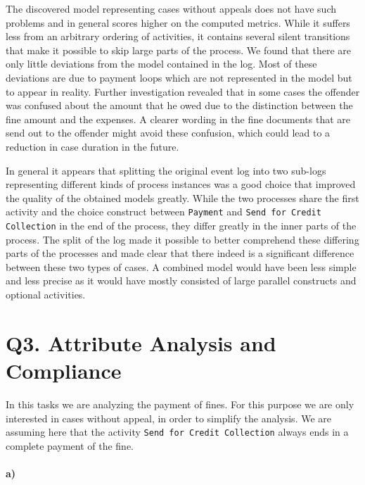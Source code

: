 \documentclass[12pt]{report}
\begin{document}
The discovered model representing cases without appeals does not have such problems and in general scores higher on the computed metrics. While it suffers less from an arbitrary ordering of activities, it contains several silent transitions that make it possible to skip large parts of the process. We found that there are only little deviations from the model contained in the log. Most of these deviations are due to payment loops which are not represented in the model but to appear in reality. Further investigation revealed that in some cases the offender was confused about the amount that he owed due to the distinction between the fine amount and the expenses. A clearer wording in the fine documents that are send out to the offender might avoid these confusion, which could lead to a reduction in case duration in the future.

In general it appears that splitting the original event log into two sub-logs representing different kinds of process instances was a good choice that improved the quality of the obtained models greatly. While the two processes share the first activity and the choice construct between \texttt{Payment} and \texttt{Send for Credit Collection} in the end of the process, they differ greatly in the inner parts of the process. The split of the log made it possible to better comprehend these differing parts of the processes and made clear that there indeed is a significant difference between these two types of cases. A combined model would have been less simple and less precise as it would have mostly consisted of large parallel constructs and optional activities.

\section{Q3. Attribute Analysis and Compliance}

In this tasks we are analyzing the payment of fines. For this purpose we are only interested in cases without appeal, in order to simplify the analysis. We are assuming here that the activity \texttt{Send for Credit Collection} always ends in a complete payment of the fine.

\paragraph{\textbf{a)}}
\end{document}
